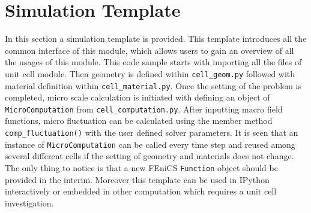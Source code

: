 \documentclass[10pt,a4paper]{scrreprt}
\begin{document}
\section{Simulation Template}
In this section a simulation template is provided. This template introduces all the common interface of this module, which allows users to gain an overview of all the usages of this module. This code sample starts with importing all the files of unit cell module. Then geometry is defined within \texttt{cell\_geom.py} followed with material definition within \texttt{cell\_material.py}. Once the setting of the problem is completed, micro scale calculation is initiated with defining an object of \texttt{MicroComputation} from \texttt{cell\_computation.py}. After inputting macro field functions, micro fluctuation can be calculated using the member method \texttt{comp\_fluctuation()} with the user defined solver parameters. It is seen that an instance of \texttt{MicroComputation} can be called every time step and reused among several different cells if the setting of geometry and materials does not change. The only thing to notice is that a new FEniCS \texttt{Function} object should be provided in the interim. Moreover this template can be used in IPython interactively or embedded in other computation which requires a unit cell investigation.
\end{document}
